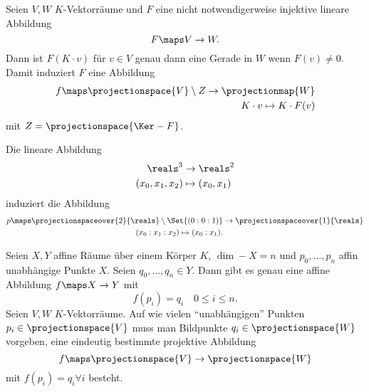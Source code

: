 \begin{bemerkung*}
  Seien \( V,W \) \( K \)-Vektorräume und \( F \) eine nicht notwendigerweise injektive lineare Abbildung
  \begin{equation*}
    F\maps V\to W.
  \end{equation*}
  Dann ist \( F(K\cdot v) \) für \( v\in V \) genau dann eine Gerade in \( W \) wenn \( F(v)\neq 0 \). Damit induziert \( F \) eine Abbildung
  \begin{equation*}
    \begin{split}
      f\maps \projectionspace{V}\setminus Z\to \projectionmap{W}\\
      K\cdot v\mapsto K\cdot F(v)
    \end{split}
  \end{equation*}
  mit \( Z=\projectionspace{\Ker-{F}} \).
\end{bemerkung*}
\begin{beispiel*}
  Die lineare Abbildung 
  \begin{equation*}
    \begin{split}
      \reals^3&\to \reals^2\\
      (x_0,x_1,x_2)&\mapsto (x_0,x_1)
    \end{split}
  \end{equation*}
  induziert die Abbildung
  \begin{equation*}
    \begin{split}
      p\maps \projectionspaceover{2}{\reals}\setminus\Set{(0:0:1)}&\to \projectionspaceover{1}{\reals}\\
      (x_0:x_1:x_2)\mapsto (x_0:x_1).
    \end{split}
  \end{equation*}
  \begin{erinnerung*}
    Seien \( X,Y \) affine Räume über einem Körper \( K \), \( \dim-{X}=n \) und \( p_0,\dotsc,p_n \) affin unabhängige Punkte \( X \). Seien \( q_0,\dotsc,q_n\in Y \). Dann gibt es genau eine affine Abbildung \( f\maps X\to Y \) mit
    \begin{equation*}
      f(p_i)=q_i\quad 0\leq i\leq n.
    \end{equation*}
    Seien \( V,W \) \( K \)-Vektorräume. Auf wie vielen \enquote{unabhängigen} Punkten \( p_i\in \projectionspace{V} \) muss man Bildpunkte \( q_i\in \projectionspace{W} \) vorgeben, \sd eine eindeutig bestimmte projektive Abbildung
    \begin{equation*}
      f\maps \projectionspace{V}\to \projectionspace{W}
    \end{equation*}
    mit \( f(p_i)=q_i \forall i\) besteht.
  \end{erinnerung*}
\end{beispiel*}
